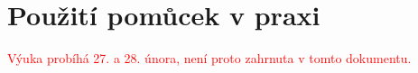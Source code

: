 \section{Použití pomůcek v praxi}
\textcolor{red}{Výuka probíhá 27. a 28. února, není proto zahrnuta v tomto dokumentu.}